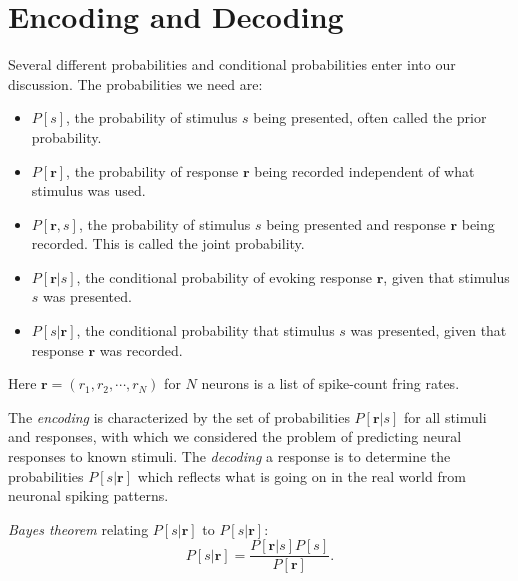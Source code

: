 \section{Encoding and Decoding}
\label{sec:Encoding and Decoding}

\begin{ntn}
  \label{ntn:probablity}
  Several different probabilities and conditional
  probabilities enter into our discussion. The probabilities we need are:
  \begin{itemize}
  \item $P[s]$, the probability of stimulus $s$ being presented,
    often called the prior probability.
  \item $P[\mathbf{r}]$, the probability of response $\mathbf{r}$
    being recorded independent of what stimulus was used.
  \item $P[\mathbf{r},s]$, the probability of stimulus $s$ being
    presented and response $\mathbf{r}$ being recorded. This is called the
    joint probability.
  \item $P[\mathbf{r}|s]$, the conditional probability of evoking response $\mathbf{r}$, given that
    stimulus $s$ was presented.
  \item $P[s|\mathbf{r}]$, the conditional probability that stimulus $s$ was presented,
    given that response $\mathbf{r}$ was recorded.
  \end{itemize}
  Here $\mathbf{r}=(r_1,r_2,\cdots,r_N)$ for $N$ neurons is a list of spike-count fring rates.
\end{ntn}

\begin{ntn}
  \label{encoding and decoding}
  The \emph{encoding} is characterized by the set of probabilities
  $P[\mathbf{r}|s]$ for all stimuli and responses, with which we
  considered the problem of predicting neural responses to known
  stimuli. The \emph{decoding} a response is to determine the probabilities
  $P[s|\mathbf{r}]$ which reflects what is going on in the real world from neuronal spiking patterns.
\end{ntn}

\begin{thm}
  \label{Bayes theorem}
  \emph{Bayes theorem} relating $P[s|\mathbf{r}]$ to $P[s|\mathbf{r}]$:
  \begin{equation*}
    \label{eq:Bayes}
   P[s|\mathbf{r}]=\frac{P[\mathbf{r}|s]P[s]}{P[\mathbf{r}]}.
 \end{equation*}
\end{thm}

